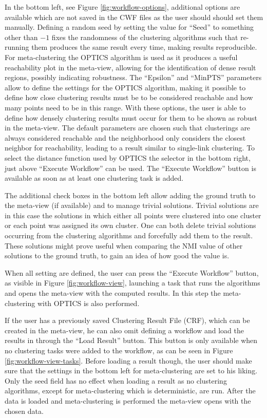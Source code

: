 \documentclass[
	a4paper,
	english,
	twoside,
	openright,               
	11pt                            
	]{report}
\begin{document}
In the bottom left, see Figure \ref{fig:workflow-options}, additional options are available which are not saved in the CWF files as the user should should set them manually. Defining a random seed by setting the value for ``Seed'' to something other than $-1$ fixes the randomness of the clustering algorithms such that re-running them produces the same result every time, making results reproducible. For meta-clustering the OPTICS \cite{10.1145/304181.304187} algorithm is used as it produces a useful reachability plot in the meta-view, allowing for the identification of dense result regions, possibly indicating robustness. The ``Epsilon'' and ``MinPTS'' parameters allow to define the settings for the OPTICS algorithm, making it possible to define how close clustering results must be to be considered reachable and how many points need to be in this range. With these options, the user is able to define how densely clustering results must occur for them to be shown as robust in the meta-view. The default parameters are chosen such that clusterings are always considered reachable and the neighborhood only considers the closest neighbor for reachability, leading to a result similar to single-link clustering. To select the distance function used by OPTICS the selector in the bottom right, just above ``Execute Workflow'' can be used. The ``Execute Workflow'' button is available as soon as at least one clustering task is added.

The additional check boxes in the bottom left allow adding the ground truth to the meta-view (if available) and to manage trivial solutions. Trivial solutions are in this case the solutions in which either all points were clustered into one cluster or each point was assigned its own cluster. One can both delete trivial solutions occurring from the clustering algorithms and forcefully add them to the result. These solutions might prove useful when comparing the NMI value of other solutions to the ground truth, to gain an idea of how good the value is.

When all setting are defined, the user can press the ``Execute Workflow'' button, as visible in Figure \ref{fig:workflow-view}, launching a task that runs the algorithms and opens the meta-view with the computed results. In this step the meta-clustering with OPTICS \cite{10.1145/304181.304187} is also performed.

If the user has a previously saved Clustering Result File (CRF), which can be created in the meta-view, he can also omit defining a workflow and load the results in through the ``Load Result'' button. This button is only available when no clustering tasks were added to the workflow, as can be seen in Figure \ref{fig:workflow-view-tasks}. Before loading a result though, the user should make sure that the settings in the bottom left for meta-clustering are set to his liking. Only the seed field has no effect when loading a result as no clustering algorithms, except for meta-clustering which is deterministic, are run. After the data is loaded and meta-clustering is performed the meta-view opens with the chosen data.
\end{document}
